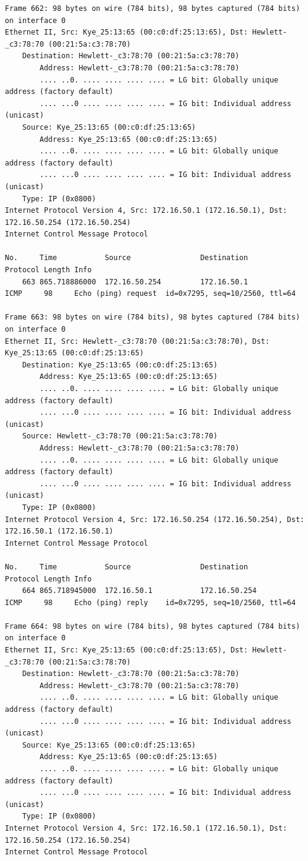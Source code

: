 \documentclass[a4paper,11pt]{article}
\begin{document}
\begin{lstlisting}
Frame 662: 98 bytes on wire (784 bits), 98 bytes captured (784 bits) on interface 0
Ethernet II, Src: Kye_25:13:65 (00:c0:df:25:13:65), Dst: Hewlett-_c3:78:70 (00:21:5a:c3:78:70)
    Destination: Hewlett-_c3:78:70 (00:21:5a:c3:78:70)
        Address: Hewlett-_c3:78:70 (00:21:5a:c3:78:70)
        .... ..0. .... .... .... .... = LG bit: Globally unique address (factory default)
        .... ...0 .... .... .... .... = IG bit: Individual address (unicast)
    Source: Kye_25:13:65 (00:c0:df:25:13:65)
        Address: Kye_25:13:65 (00:c0:df:25:13:65)
        .... ..0. .... .... .... .... = LG bit: Globally unique address (factory default)
        .... ...0 .... .... .... .... = IG bit: Individual address (unicast)
    Type: IP (0x0800)
Internet Protocol Version 4, Src: 172.16.50.1 (172.16.50.1), Dst: 172.16.50.254 (172.16.50.254)
Internet Control Message Protocol

No.     Time           Source                Destination           Protocol Length Info
    663 865.718886000  172.16.50.254         172.16.50.1           ICMP     98     Echo (ping) request  id=0x7295, seq=10/2560, ttl=64

Frame 663: 98 bytes on wire (784 bits), 98 bytes captured (784 bits) on interface 0
Ethernet II, Src: Hewlett-_c3:78:70 (00:21:5a:c3:78:70), Dst: Kye_25:13:65 (00:c0:df:25:13:65)
    Destination: Kye_25:13:65 (00:c0:df:25:13:65)
        Address: Kye_25:13:65 (00:c0:df:25:13:65)
        .... ..0. .... .... .... .... = LG bit: Globally unique address (factory default)
        .... ...0 .... .... .... .... = IG bit: Individual address (unicast)
    Source: Hewlett-_c3:78:70 (00:21:5a:c3:78:70)
        Address: Hewlett-_c3:78:70 (00:21:5a:c3:78:70)
        .... ..0. .... .... .... .... = LG bit: Globally unique address (factory default)
        .... ...0 .... .... .... .... = IG bit: Individual address (unicast)
    Type: IP (0x0800)
Internet Protocol Version 4, Src: 172.16.50.254 (172.16.50.254), Dst: 172.16.50.1 (172.16.50.1)
Internet Control Message Protocol

No.     Time           Source                Destination           Protocol Length Info
    664 865.718945000  172.16.50.1           172.16.50.254         ICMP     98     Echo (ping) reply    id=0x7295, seq=10/2560, ttl=64

Frame 664: 98 bytes on wire (784 bits), 98 bytes captured (784 bits) on interface 0
Ethernet II, Src: Kye_25:13:65 (00:c0:df:25:13:65), Dst: Hewlett-_c3:78:70 (00:21:5a:c3:78:70)
    Destination: Hewlett-_c3:78:70 (00:21:5a:c3:78:70)
        Address: Hewlett-_c3:78:70 (00:21:5a:c3:78:70)
        .... ..0. .... .... .... .... = LG bit: Globally unique address (factory default)
        .... ...0 .... .... .... .... = IG bit: Individual address (unicast)
    Source: Kye_25:13:65 (00:c0:df:25:13:65)
        Address: Kye_25:13:65 (00:c0:df:25:13:65)
        .... ..0. .... .... .... .... = LG bit: Globally unique address (factory default)
        .... ...0 .... .... .... .... = IG bit: Individual address (unicast)
    Type: IP (0x0800)
Internet Protocol Version 4, Src: 172.16.50.1 (172.16.50.1), Dst: 172.16.50.254 (172.16.50.254)
Internet Control Message Protocol


\end{lstlisting}
\end{document}
